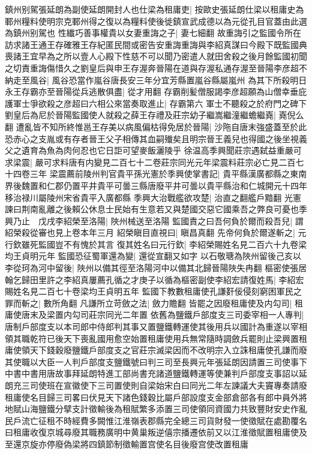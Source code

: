 鎮州别駕張延朗為副使延朗開封人也仕梁為租庸吏|{
	按歐史張延朗仕梁以租庸史為鄆州糧料使明宗克鄆州得之復以為糧料使後徙鎮宣武成德以為元從孔目官蓋由此選為鎮州别駕也}
性纎巧善事權貴以女妻重誨之子|{
	妻七細翻}
故重誨引之監國令所在訪求諸王通王存確雅王存紀匿民間或密告安重誨重誨與李紹真謀曰今殿下既監國典喪諸王宜早為之所以壹人心殿下性慈不可以聞乃密遣人就田舍殺之後月餘監國初聞之切責重誨傷惜久之劉皇后與申王存渥奔晉陽在道與存渥私通存渥至晉陽李彦超不納走至風谷|{
	風谷恐當作嵐谷唐長安三年分宜芳縣置嵐谷縣屬嵐州}
為其下所殺明日永王存霸亦至晉陽從兵逃散俱盡|{
	從才用翻}
存霸削髪僧服謁李彦超願為山僧幸垂庇護軍士爭欲殺之彦超曰六相公來當奏取進止|{
	存霸第六}
軍士不聽殺之於府門之碑下劉皇后為尼於晉陽監國使人就殺之薛王存禮及莊宗幼子繼嵩繼潼繼蟾繼嶤|{
	嶤倪么翻}
遭亂皆不知所終惟邕王存美以病風偏枯得免居於晉陽|{
	沙陁自唐末強盛蓋至於此恐赤心之支胤或有存者晉王父子相傳其血嗣殱矣且明宗晉王義兒也得國之後坐視義父之遺育為魚為肉何忍也它日詎可望麥飯灑陵乎}
徐温高季興聞莊宗遇弑益重嚴可求梁震|{
	嚴可求料唐有内變見二百七十二卷莊宗同光元年梁震料莊宗必亡見二百七十四卷三年}
梁震薦前陵州判官貴平孫光憲於季興使掌書記|{
	貴平縣漢廣都縣之東南界後魏置和仁郡仍置平井貴平可曇三縣唐廢平井可曇以貴平縣治和仁城開元十四年移治禄川屬陵州宋省貴平入廣都縣}
季興大治戰艦欲攻楚|{
	治直之翻艦戶黯翻}
光憲諫曰荆南亂離之後賴公休息士民始有生意若又與楚國交惡它國乘吾之弊良可憂也季興乃止　戊戌李紹榮至洛陽|{
	陜州械送至洛陽}
監國責之曰吾何負於爾而殺吾兒|{
	謂紹榮殺從審也見上卷本年三月}
紹榮瞋目直視曰|{
	瞋昌真翻}
先帝何負於爾遂斬之|{
	元行欽雖死監國豈不有愧於其言}
復其姓名曰元行欽|{
	李紹榮賜姓名見二百六十九卷梁均王貞明元年}
監國恐征蜀軍還為變|{
	還從宣翻又如字}
以石敬瑭為陜州留後己亥以李從珂為河中留後|{
	陜州以備其徑至洛陽河中以備其北歸晉陽陜失冉翻}
樞密使張居翰乞歸田里許之李紹真屢薦孔循之才庚子以循為樞密副使李紹宏請復姓馬|{
	李紹宏賜姓名見二百七十卷梁均王貞明五年}
監國下教數租庸使孔謙姧佞侵刻窮困軍民之罪而斬之|{
	數所角翻}
凡謙所立苛斂之法|{
	斂力贍翻}
皆罷之因廢租庸使及内勾司|{
	租庸使唐末及梁置内勾司莊宗同光二年置}
依舊為鹽鐵戶部度支三司委宰相一人專判|{
	唐制戶部度支以本司郎中侍郎判其事又置鹽鐵轉運使其後用兵以國計為重遂以宰相領其職乾符已後天下喪亂國用愈空始置租庸使用兵無常隨時調斂兵罷則止梁興置租庸使領天下錢穀廢鹽鐵戶部度支之官莊宗滅梁因而不改明宗入立誅租庸使孔謙而廢其使職以大臣一人判戶部度支鹽鐵號曰判三司至長興元年張延朗因請置三司使事下中書中書用唐故事拜延朗特進工部尚書充諸道鹽鐵轉運等使兼判戶部度支事詔以延朗充三司使班在宣徽使下三司置使則自梁始宋白曰同光二年左諫議大夫竇專奏請廢租庸使名目歸三司畧曰伏見天下諸色錢穀比屬戶部設度支金部倉部各有郎中員外將地賦山海鹽鐵分擘支計徵輸後為租賦繁多添置三司使領同資國力共致豐財安史作亂民戶流亡征租不時經費多闕惟江淮嶺表郡縣完全總三司貨財發一使徵賦在處勘覆名曰租庸收復京城尋廢其職務廣明中黄巢叛逆僖宗播遷依前又以江淮徵賦置租庸使及至還京旋亦停廢偽梁將四鎮節制徵輸置宫使名目後廢宫使改置租庸}
